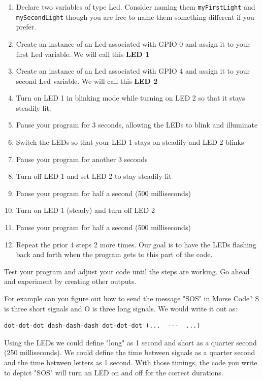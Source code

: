 \begin{enumerate}
	\item Declare two variables of type Led. Consider naming them \texttt{myFirstLight} and \texttt{mySecondLight} though you are free to name them something different if you prefer.
	\item Create an instance of an Led associated with GPIO 0 and assign it to your first Led variable. We will call this \textbf{LED 1}
	\item Create an instance of an Led associated with GPIO 4 and assign it to your second Led variable. We will call this \textbf{LED 2}
	\item Turn on LED 1 in blinking mode while turning on LED 2 so that it stays steadily lit.
	\item Pause your program for 3 seconds, allowing the LEDs to blink and illuminate
	\item Switch the LEDs so that your LED 1 stays on steadily and LED 2 blinks
	\item Pause your program for another 3 seconds
	\item Turn off LED 1 and set LED 2 to stay steadily lit
	\item Pause your program for half a second (500 milliseconds)
	\item Turn on LED 1 (steady) and turn off LED 2
	\item Pause your program for half a second (500 milliseconds)
	\item Repeat the prior 4 steps 2 more times. Our goal is to have the LEDs flashing back and forth when the program gets to this part of the code.
\end{enumerate}

Test your program and adjust your code until the steps are working. Go ahead and experiment by creating other outputs. 

For example can you figure out how to send the message "SOS" in Morse Code? S is three short signals and O is three long signals. We would write it out as:

\beforeverb
\begin{verbatim}
dot-dot-dot dash-dash-dash dot-dot-dot (...  ---  ...)
\end{verbatim}
\afterverb

Using the LEDs we could define "long" as 1 second and short as a quarter second (250 milliseconds). We could define the time between signals as a quarter second and the time between letters as 1 second. With those timings, the code you write to depict "SOS" will turn an LED on and off for the correct durations.

